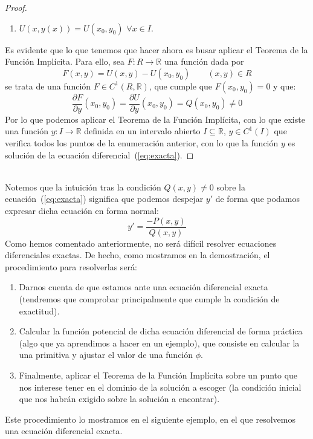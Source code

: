 \begin{prop}
\begin{proof}
\begin{enumerate}
            \item $U(x,y(x))=U(x_0,y_0)$ $\forall x\in I$.
        \end{enumerate}
        Es evidente que lo que tenemos que hacer ahora es busar aplicar el Teorema de la Función Implícita. Para ello, sea $F:R\rightarrow\mathbb{R}$ una función dada por
        \begin{equation*}
            F(x,y) = U(x,y) - U(x_0,y_0) \qquad (x,y)\in R
        \end{equation*}
        se trata de una función $F\in C^1(R,\mathbb{R})$, que cumple que $F(x_0,y_0)=0$ y que:
        \begin{equation*}
            \dfrac{\partial F}{\partial y}(x_0,y_0) = \dfrac{\partial U}{\partial y}(x_0,y_0) = Q(x_0,y_0) \neq 0
        \end{equation*}
        Por lo que podemos aplicar el Teorema de la Función Implícita, con lo que existe una función $y:I\rightarrow\mathbb{R}$ definida en un intervalo abierto $I\subseteq \mathbb{R}$, $y\in C^1(I)$ que verifica todos los puntos de la enumeración anterior, con lo que la función $y$ es solución de la ecuación diferencial~(\ref{eq:exacta}).
    \end{proof}
\end{prop}~\\

\noindent
Notemos que la intuición tras la condición $Q(x,y)\neq 0$ sobre la ecuación~(\ref{eq:exacta}) significa que podemos despejar $y'$ de forma que podamos expresar dicha ecuación en forma normal:
\begin{equation*}
    y' = \dfrac{-P(x,y)}{Q(x,y)}
\end{equation*}
Como hemos comentado anteriormente, no será difícil resolver ecuaciones diferenciales exactas. De hecho, como mostramos en la demostración, el procedimiento para resolverlas será:
\begin{enumerate}
    \item Darnos cuenta de que estamos ante una ecuación diferencial exacta (tendremos que comprobar principalmente que cumple la condición de exactitud).
    \item Calcular la función potencial de dicha ecuación diferencial de forma práctica (algo que ya aprendimos a hacer en un ejemplo), que consiste en calcular la una primitiva y ajustar el valor de una función $\phi$.
    \item Finalmente, aplicar el Teorema de la Función Implícita sobre un punto que nos interese tener en el dominio de la solución a escoger (la condición inicial que nos habrán exigido sobre la solución a encontrar).
\end{enumerate}
Este procedimiento lo mostramos en el siguiente ejemplo, en el que resolvemos una ecuación diferencial exacta.

